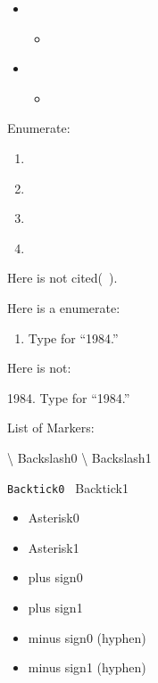 \begin{itemize}
\item ~\citep{Kormendy&Ho2013ARA&A, Koss2012ApJ}

\begin{itemize}
\item ~\citep{Kormendy&Ho2013ARA&A, Koss2012ApJ}

\end{itemize}

\item ~\citep[foo]{Kormendy&Ho2013ARA&A, Koss2012ApJ}

\begin{itemize}
\item ~\citep[foo][bar]{Kormendy&Ho2013ARA&A, Koss2012ApJ}

\end{itemize}

\end{itemize}

Enumerate:

\begin{enumerate}
\item  \citet{Kormendy&Ho2013ARA&A, Koss2012ApJ}

\item  \citet{Kormendy&Ho2013ARA&A, Koss2012ApJ}

\item  \citet[foo]{Kormendy&Ho2013ARA&A, Koss2012ApJ}

\item  \citet[foo][bar]{Kormendy&Ho2013ARA&A, Koss2012ApJ}

\end{enumerate}

Here is not cited(~\nocite{Povic2012A&A}).

Here is a enumerate:

\begin{enumerate}
\item Type for ``1984.''

\end{enumerate}

Here is not:

1984. Type for ``1984.''

List of Markers:

\textbackslash{} Backslash0
\textbackslash{} Backslash1

\texttt{Backtick0
} Backtick1

\begin{itemize}
\item Asterisk0

\item Asterisk1

\item plus sign0

\item plus sign1

\item minus sign0 (hyphen)

\item minus sign1 (hyphen)

\end{itemize}

